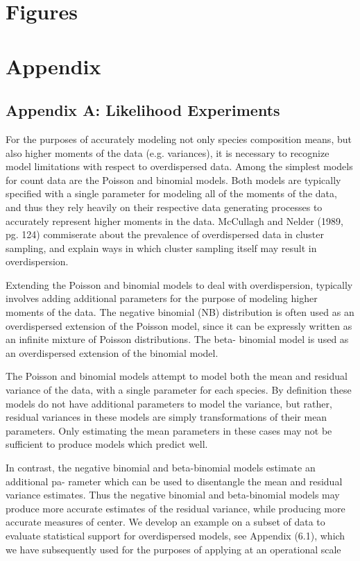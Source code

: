 \documentclass[12pt]{article}
\begin{document}
%
%
\section{Figures}
%
%

%
%
\section{Appendix}\label{appendix}
%
%

%
\subsection{Appendix A: Likelihood Experiments}\label{likelihoodAppendix}

%
For the purposes of accurately modeling not only species composition means, 
but also higher moments of the data (e.g. variances), it is necessary to 
recognize model limitations with respect to overdispersed data. Among the 
simplest models for count data are the Poisson and binomial models. Both 
models are typically specified with a single parameter for modeling all of the 
moments of the data, and thus they rely heavily on their respective data 
generating processes to accurately represent higher moments in the data. 
McCullagh and Nelder (1989, pg. 124) commiserate about the prevalence of 
overdispersed data in cluster sampling, and explain ways in which cluster 
sampling itself may result in overdispersion.  

%
Extending the Poisson and binomial models to deal with overdispersion, 
typically involves adding additional parameters for the purpose of modeling 
higher moments of the data. The negative binomial (NB) distribution is often 
used as an overdispersed extension of the Poisson model, since it can be 
expressly written as an infinite mixture of Poisson distributions. The beta-
binomial model is used as an overdispersed extension of the binomial model.  

%
The Poisson and binomial models attempt to model both the mean and residual 
variance of the data, with a single parameter for each species. By definition 
these models do not have additional parameters to model the variance, but 
rather, residual variances in these models are simply transformations of their 
mean parameters. Only estimating the mean parameters in these cases may not be 
sufficient to produce models which predict well.

%
In contrast, the negative binomial and beta-binomial models estimate an 
additional pa- rameter which can be used to disentangle the mean and residual 
variance estimates. Thus the negative binomial and beta-binomial models may 
produce more accurate estimates of the residual variance, while producing more 
accurate measures of center. We develop an example on a subset of data to 
evaluate statistical support for overdispersed models, see Appendix (6.1), which we have subsequently used for the purposes of applying at an operational scale 
\end{document}

